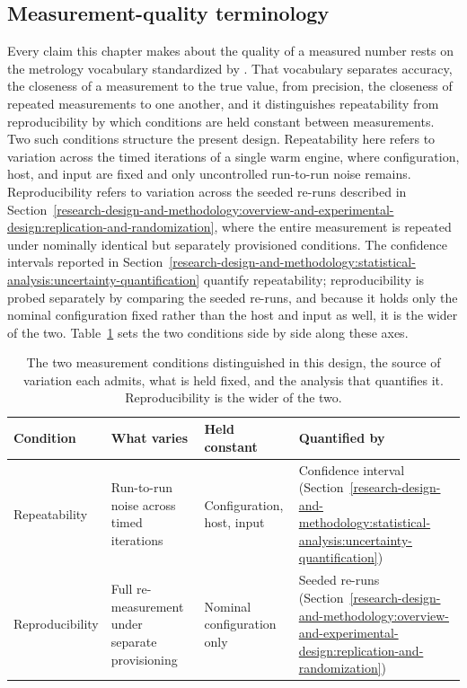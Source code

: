 \subsection{Measurement-quality terminology}
\label{research-design-and-methodology:statistical-analysis:measurement-quality-terminology}
Every claim this chapter makes about the quality of a measured number rests on the metrology vocabulary standardized by \textcite{jcgm2012_international_vocabulary_of_metrology}. That vocabulary separates accuracy, the closeness of a measurement to the true value, from precision, the closeness of repeated measurements to one another, and it distinguishes repeatability from reproducibility by which conditions are held constant between measurements. Two such conditions structure the present design. Repeatability here refers to variation across the timed iterations of a single warm engine, where configuration, host, and input are fixed and only uncontrolled run-to-run noise remains. Reproducibility refers to variation across the seeded re-runs described in Section~\ref{research-design-and-methodology:overview-and-experimental-design:replication-and-randomization}, where the entire measurement is repeated under nominally identical but separately provisioned conditions. The confidence intervals reported in Section~\ref{research-design-and-methodology:statistical-analysis:uncertainty-quantification} quantify repeatability; reproducibility is probed separately by comparing the seeded re-runs, and because it holds only the nominal configuration fixed rather than the host and input as well, it is the wider of the two. Table~\ref{tab:repeatability-vs-reproducibility} sets the two conditions side by side along these axes.

\begin{table}[H]
	\centering
	\caption[Repeatability versus reproducibility]{The two measurement conditions distinguished in this design, the source of variation each admits, what is held fixed, and the analysis that quantifies it. Reproducibility is the wider of the two.}
	\label{tab:repeatability-vs-reproducibility}
	\begin{tabular}{@{}l >{\raggedright\arraybackslash}p{} >{\raggedright\arraybackslash}p{} >{\raggedright\arraybackslash}p{} @{}}
		\toprule
		Condition & What varies & Held constant & Quantified by \\
		\midrule
		Repeatability & Run-to-run noise across timed iterations & Configuration, host, input & Confidence interval (Section~\ref{research-design-and-methodology:statistical-analysis:uncertainty-quantification}) \\
		Reproducibility & Full re-measurement under separate provisioning & Nominal configuration only & Seeded re-runs (Section~\ref{research-design-and-methodology:overview-and-experimental-design:replication-and-randomization}) \\
		\bottomrule
	\end{tabular}
\end{table}


